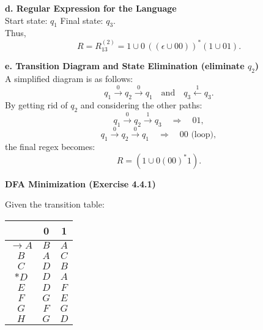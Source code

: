 \documentclass{article}
\theoremstyle{theorem}
\theoremstyle{definition}
\theoremstyle{remark}
\begin{document}
\medskip

\textbf{d. Regular Expression for the Language}\\[1mm]
Start state: \(q_1\) \quad Final state: \(q_3\).\\[1mm]
Thus,
\[
R = R_{13}^{(2)} = 1 \cup 0\,( (\epsilon \cup 00) )^*(1 \cup 01).
\]

\medskip

\textbf{e. Transition Diagram and State Elimination (eliminate \(q_2\))}\\[1mm]
A simplified diagram is as follows:
\[
q_1 \xrightarrow{0} q_2 \xrightarrow{0} q_1 \quad \text{and} \quad q_3 \xleftarrow{1} q_3.
\]
By getting rid of \(q_2\) and considering the other paths:
\[
q_1 \xrightarrow{0} q_2 \xrightarrow{1} q_3 \quad \Rightarrow \quad 01,
\]
\[
q_1 \xrightarrow{0} q_2 \xrightarrow{0} q_1 \quad \Rightarrow \quad 00 \text{ (loop)},
\]
the final regex becomes:
\[
R = \left( 1 \cup 0(00)^*1 \right).
\]

\bigskip

\textbf{DFA Minimization (Exercise 4.4.1)}

Given the transition table:
\begin{center}
\begin{tabular}{|c|c|c|}
\hline
       & 0   & 1   \\ \hline
$\rightarrow A$ & $B$ & $A$ \\ \hline
$B$ & $A$ & $C$ \\ \hline
$C$ & $D$ & $B$ \\ \hline
$*D$ & $D$ & $A$ \\ \hline
$E$ & $D$ & $F$ \\ \hline
$F$ & $G$ & $E$ \\ \hline
$G$ & $F$ & $G$ \\ \hline
$H$ & $G$ & $D$ \\ \hline
\end{tabular}
\end{center}

\medskip
\end{document}
